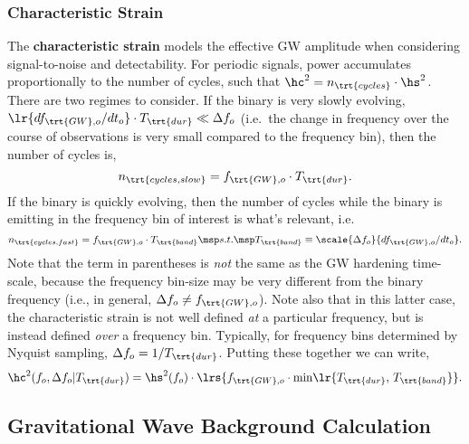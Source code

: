 \documentclass[10pt, oneside, onecolumn]{article}   	%
\newcommand{\fobsgw}{f_{\trt{GW},o}}
\newcommand{\tdur}{T_\trt{dur}}
\begin{document}
            \subsubsection{Characteristic Strain }
            The \textbf{characteristic strain} models the effective GW amplitude when considering signal-to-noise and detectability.  For periodic signals, power accumulates proportionally to the number of cycles, such that $\hc^2 = n_\trt{cycles} \cdot \hs^2$.  There are two regimes to consider.  If the binary is very slowly evolving, $\lr{d\fobsgw/dt_o} \cdot \tdur \ll \Delta f_o$ (i.e.~the change in frequency over the course of observations is very small compared to the frequency bin), then the number of cycles is,
            \begin{equation}
                n_\trt{cycles,slow} = \fobsgw \cdot \tdur.
            \end{equation}
            If the binary is quickly evolving, then the number of cycles while the binary is emitting in the frequency bin of interest is what's relevant, i.e.
            \begin{equation}
                n_\trt{cycles,fast} = \fobsgw \cdot T_\trt{band} \msp s.t. \msp T_\trt{band} \equiv \scale{\Delta f_o }{ d\fobsgw / dt_o }.
            \end{equation}
            Note that the term in parentheses is \textit{not} the same as the GW hardening time-scale, because the frequency bin-size may be very different from the binary frequency (i.e., in general, $\Delta f_o \neq \fobsgw$).  Note also that in this latter case, the characteristic strain is not well defined \textit{at} a particular frequency, but is instead defined \textit{over} a frequency bin.  Typically, for frequency bins determined by Nyquist sampling, $\Delta f_o = 1 / \tdur$.  Putting these together we can write,
            \begin{equation}
                \hc^2(f_o,\Delta f_o|\tdur) = \hs^2(f_o) \cdot \lrs{\fobsgw \cdot \min\!\lr{\tdur, \, T_\trt{band}}}.
            \end{equation}




        \subsection{Gravitational Wave Background Calculation}
            \label{sec:gw_gwb_calc}
\end{document}
